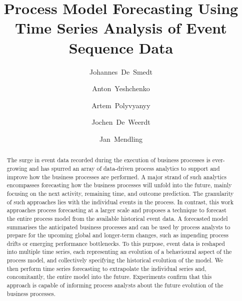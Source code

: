 \documentclass{svproc}
\begin{document}
\mainmatter
%
\title{Process Model Forecasting Using Time Series Analysis of Event Sequence Data}
%
%
\author{Johannes~De~Smedt \and Anton~Yeshchenko \and Artem~Polyvyanyy \and Jochen~De~Weerdt \and Jan~Mendling}
%
\maketitle

\begin{abstract}
The surge in event data recorded during the execution of business processes is ever-growing and has spurred an array of data-driven process analytics to support and improve how the business processes are performed.
A major strand of such analytics encompasses forecasting how the business processes will unfold into the future, mainly focusing on the next activity, remaining time, and outcome prediction.
The granularity of such approaches lies with the individual events in the process.
In contrast, this work approaches process forecasting at a larger scale and proposes a technique to forecast the entire process model from the available historical event data.
A forecasted model summarises the anticipated business processes and can be used by process analysts to prepare for the upcoming global and longer-term changes, such as impending process drifts or emerging performance bottlenecks.
To this purpose, event data is reshaped into multiple time series, each representing an evolution of a behavioural aspect of the process model, and collectively specifying the historical evolution of the model.
We then perform time series forecasting to extrapolate the individual series and, concomitantly, the entire model into the future.
Experiments confirm that this approach is capable of informing process analysts about the future evolution of the business processes.
\end{abstract}
%




%
\end{document}
